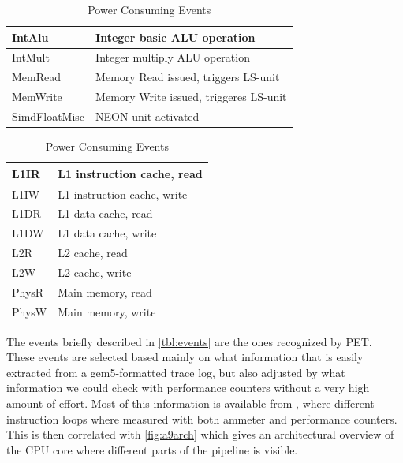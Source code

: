 \begin{table}[ht]
    \centering
    \begin{minipage}[b]{\linewidth}
        \centering
        \begin{tabular}{|l|l|}
            \hline
            IntAlu    & Integer basic ALU operation\\
            \hline
            IntMult    & Integer multiply ALU operation \\
            \hline
            MemRead    & Memory Read issued, triggers LS-unit \\
            \hline
            MemWrite    & Memory Write issued, triggeres LS-unit \\
            \hline
            SimdFloatMisc     & NEON-unit activated \\
            \hline
        \end{tabular}
    \end{minipage}

    \begin{minipage}[b]{\linewidth}
        \centering
        \begin{tabular}{|l|l|}
            \hline
            L1IR    & L1 instruction cache, read \\
            \hline
            L1IW    & L1 instruction cache, write \\
            \hline
            L1DR    & L1 data cache, read \\
            \hline
            L1DW    & L1 data cache, write \\
            \hline
            L2R     & L2 cache, read \\
            \hline
            L2W     & L2 cache, write \\
            \hline
            PhysR   & Main memory, read \\
            \hline
            PhysW   & Main memory, write \\
            \hline
        \end{tabular}
    \end{minipage}
    \caption{Power Consuming Events}
    \label{tbl:events}
\end{table}

The events briefly described in \autoref{tbl:events} are the ones recognized by
PET.  These events are selected based mainly on what information that is easily
extracted from a gem5-formatted trace log, but also adjusted by what information
we could check with performance counters without a very high amount of effort.
Most of this information is available from \cite{rundehvatum2013exploring},
where different instruction loops where measured with both ammeter and
performance counters. This is then correlated with \autoref{fig:a9arch} which
gives an architectural overview of the CPU core where different parts of the
pipeline is visible.

